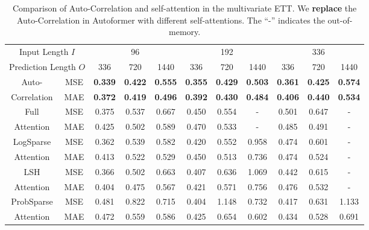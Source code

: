\begin{table}[hbp]
    \caption{Comparison of Auto-Correlation and self-attention in the multivariate ETT. We \textbf{replace} the Auto-Correlation in Autoformer with different self-attentions. The ``-'' indicates the out-of-memory.}\label{tab:ablation_of_attention}
    \centering
    \begin{small}
    \renewcommand{\multirowsetup}{\centering}
    \setlength{\tabcolsep}{6.6pt}
    \begin{tabular}{c|c|ccccccccc}
    \toprule
    \multicolumn{2}{c}{Input Length $I$} & \multicolumn{3}{c}{96}  & \multicolumn{3}{c}{192} & \multicolumn{3}{c}{336}   \\
    \cmidrule(lr){3-5} \cmidrule(lr){6-8}\cmidrule(lr){9-11} 
    \multicolumn{2}{c}{Prediction Length $O$} & 336 & 720 & 1440 & 336 & 720 & 1440 & 336 & 720 & 1440  \\
    \toprule
    Auto- & MSE & \textbf{0.339}&	\textbf{0.422}&	\textbf{0.555}&	\textbf{0.355}&	\textbf{0.429}&	\textbf{0.503}&	\textbf{0.361} &	\textbf{0.425} &	\textbf{0.574} \\
    Correlation & MAE & \textbf{0.372} & \textbf{0.419} & \textbf{0.496} & \textbf{0.392} & \textbf{0.430} & \textbf{0.484} & \textbf{0.406} & 	\textbf{0.440} & \textbf{0.534} \\
    \midrule
    Full & MSE & 0.375	& 0.537 & 0.667& 0.450 & 0.554 & -  &	0.501&	0.647&	- \\
    Attention\cite{NIPS2017_3f5ee243} & MAE &0.425&	0.502&	0.589&	0.470&	0.533 &	- &	0.485&	0.491&	-  \\
    \midrule
    LogSparse & MSE & 0.362 & 	0.539 & 	0.582 & 	0.420 & 	0.552 & 	0.958 & 	0.474 & 	0.601 & - \\
    Attention\cite{2019Enhancing} & MAE & 0.413	 & 0.522 & 	0.529 & 	0.450 & 	0.513 & 	0.736 & 	0.474 & 	0.524 & - \\
    \midrule
    LSH & MSE & 0.366 & 	0.502 & 	0.663 & 	0.407 & 	0.636 & 	1.069 & 	0.442 & 	0.615 & - \\
    Attention\cite{kitaev2020reformer} & MAE & 0.404	 & 0.475 & 	0.567 & 	0.421 & 	0.571 & 	0.756 & 	0.476 & 	0.532 & - \\
    \midrule
    ProbSparse & MSE & 0.481 & 	0.822 & 0.715 & 0.404 & 1.148 & 	0.732 & 0.417 & 0.631 & 1.133\\
    Attention\cite{haoyietal-informer-2021} & MAE &0.472 &	0.559	& 0.586 &	0.425	&0.654&	0.602&	0.434	&0.528 & 0.691 \\
    \bottomrule
    \end{tabular}
    \end{small}
    \vspace{-5pt}
\end{table}

